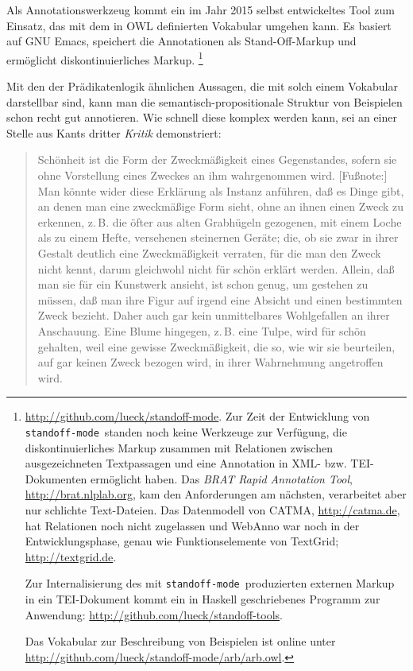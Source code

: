 \documentclass{article}
\newcommand*{\lit}{\textit}%
\newcommand*{\englisch}[1]{\foreignlanguage{english}{\textit{#1}}}%
\newcommand*{\som}{\texttt{standoff-mode}}%
\begin{document}
Als Annotationswerkzeug kommt ein im Jahr 2015 selbst entwickeltes
Tool zum Einsatz, das mit dem in OWL definierten Vokabular umgehen
kann. Es basiert auf GNU Emacs, speichert die Annotationen als
Stand-Off-Markup und ermöglicht diskontinuierliches Markup.%
\footnote{\url{http://github.com/lueck/standoff-mode}. Zur Zeit der
  Entwicklung von \som\ standen noch keine Werkzeuge zur Verfügung,
  die diskontinuierliches Markup zusammen mit Relationen zwischen
  ausgezeichneten Textpassagen und eine Annotation in XML-
  bzw. TEI-Dokumenten ermöglicht haben. Das \englisch{BRAT Rapid
    Annotation Tool}, \url{http://brat.nlplab.org}, kam den
  Anforderungen am nächsten, verarbeitet aber nur schlichte
  Text-Dateien. Das Datenmodell von CATMA, \url{http://catma.de}, hat
  Relationen noch nicht zugelassen und WebAnno
  \parencite{EckartDeCast2016a} war noch in der Entwicklungsphase,
  genau wie Funktionselemente von TextGrid;
  \url{http://textgrid.de}.\par
  Zur Internalisierung des mit \som\ produzierten externen Markup in
  ein TEI-Dokument kommt ein in Haskell geschriebenes Programm zur
  Anwendung: \url{http://github.com/lueck/standoff-tools}.\par
  Das Vokabular zur Beschreibung von Beispielen ist online unter
  \url{http://github.com/lueck/standoff-mode/arb/arb.owl}.} %

Mit den der Prädikatenlogik ähnlichen Aussagen, die mit solch einem
Vokabular darstellbar sind, kann man die semantisch-propositionale
Struktur von Beispielen schon recht gut annotieren. Wie schnell diese
komplex werden kann, sei an einer Stelle aus Kants dritter
\lit{Kritik} \parencite[\pno\,77\psq\ (§\,17)]{KantKdU} demonstriert:

\begin{quote}
  Schönheit ist die Form der Zweckmäßigkeit eines Gegenstandes, sofern
  sie ohne Vorstellung eines Zweckes an ihm wahrgenommen
  wird. [Fußnote:] Man könnte wider diese Erklärung als Instanz
  anführen, daß es Dinge gibt, an denen man eine zweckmäßige Form
  sieht, ohne an ihnen einen Zweck zu erkennen, z.\,B. die öfter aus
  alten Grabhügeln gezogenen, mit einem Loche als zu einem Hefte,
  versehenen steinernen Geräte; die, ob sie zwar in ihrer Gestalt
  deutlich eine Zweckmäßigkeit verraten, für die man den Zweck nicht
  kennt, darum gleichwohl nicht für schön erklärt werden. Allein, daß
  man sie für ein Kunstwerk ansieht, ist schon genug, um gestehen zu
  müssen, daß man ihre Figur auf irgend eine Absicht und einen
  bestimmten Zweck bezieht. Daher auch gar kein unmittelbares
  Wohlgefallen an ihrer Anschauung. Eine Blume hingegen, z.\,B. eine
  Tulpe, wird für schön gehalten, weil eine gewisse Zweckmäßigkeit,
  die so, wie wir sie beurteilen, auf gar keinen Zweck bezogen wird,
  in ihrer Wahrnehmung angetroffen wird.
\end{quote}
\end{document}
